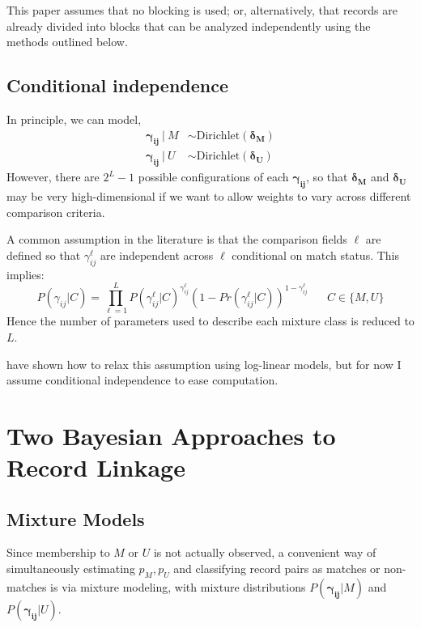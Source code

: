 \documentclass[11pt,reqno]{amsart}
\newcommand\gamij{\mathbf{\gamma_{ij}}}
\begin{document}
This paper assumes that no blocking is used; or, alternatively, that records are already divided into blocks that can be analyzed independently using the methods outlined below.  

\subsection{Conditional independence} In principle, we can model,
\begin{align*} \gamij\  |\  M &\sim \text{Dirichlet}(\mathbf{\delta_M})\\
\gamij\  |\  U &\sim \text{Dirichlet}(\mathbf{\delta_U}) \end{align*}
However, there are $2^{L}-1$ possible configurations of each $\gamij$, so that $\mathbf{\delta_M}$ and $\mathbf{\delta_U}$ may be very high-dimensional if we want to allow weights to vary across different comparison criteria.

A common assumption in the literature is that the comparison fields $\ell$ are defined so that $\gamma_{ij}^{\ell}$ are independent across $\ell$ conditional on match status.  This implies:
 \begin{equation} 
 P(\gamma_{ij} | C) = \prod_{\ell=1}^L P(\gamma_{ij}^{\ell} | C)^{\gamma_{ij}^{\ell}}(1-Pr(\gamma_{ij}^{\ell} | C))^{1-\gamma_{ij}^{\ell}} \hspace{20pt} C\in \{M, U\} 
 \label{eq:condInd}
 \end{equation}
Hence the number of parameters used to describe each mixture class is reduced to $L$.  

\cite{larsen_rubin_2001} have shown how to relax this assumption using log-linear models, but for now I assume conditional independence to ease computation. 
 
 
 \section{Two Bayesian Approaches to Record Linkage}

\subsection{Mixture Models}  Since membership to $M$ or $U$ is not actually observed, a convenient way of simultaneously estimating $p_M, p_U$ and classifying record pairs as matches or non-matches is via mixture modeling, with mixture distributions $P(\gamij | M)$ and $P(\gamij | U)$.   %
\end{document}
